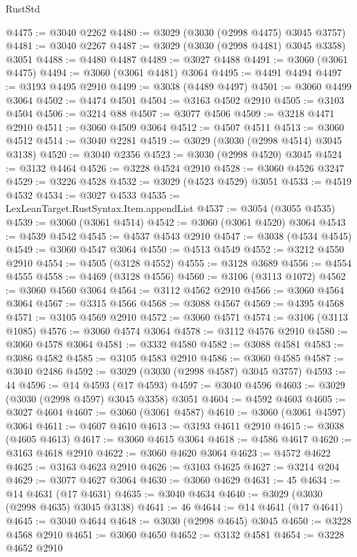 \begin{lexlean}{RustStd}
\begin{coremodule}
@4475 := @3040 @2262
@4480 := @3029 (@3030 (@2998 @4475) @3045 @3757)
@4481 := @3040 @2267
@4487 := @3029 (@3030 (@2998 @4481) @3045 @3358) @3051
@4488 := @4480 @4487
@4489 := @3027 @4488
@4491 := @3060 (@3061 @4475)
@4494 := @3060 (@3061 @4481) @3064
@4495 := @4491 @4494
@4497 := @3193 @4495 @2910
@4499 := @3038 (@4489 @4497)
@4501 := @3060 @4499 @3064
@4502 := @4474 @4501
@4504 := @3163 @4502 @2910
@4505 := @3103 @4504
@4506 := @3214 @88
@4507 := @3077 @4506
@4509 := @3218 @4471 @2910
@4511 := @3060 @4509 @3064
@4512 := @4507 @4511
@4513 := @3060 @4512
@4514 := @3040 @2281
@4519 := @3029 (@3030 (@2998 @4514) @3045 @3138)
@4520 := @3040 @2356
@4523 := @3030 (@2998 @4520) @3045
@4524 := @3132 @4464
@4526 := @3228 @4524 @2910
@4528 := @3060 @4526 @3247
@4529 := @3226 @4528
@4532 := @3029 (@4523 @4529) @3051
@4533 := @4519 @4532
@4534 := @3027 @4533
@4535 := LexLeanTarget.RustSyntax.Item.appendList
@4537 := @3054 (@3055 @4535)
@4539 := @3060 (@3061 @4514)
@4542 := @3060 (@3061 @4520) @3064
@4543 := @4539 @4542
@4545 := @4537 @4543 @2910
@4547 := @3038 (@4534 @4545)
@4549 := @3060 @4547 @3064
@4550 := @4513 @4549
@4552 := @3212 @4550 @2910
@4554 := @4505 (@3128 @4552)
@4555 := @3128 @3689
@4556 := @4554 @4555
@4558 := @4469 (@3128 @4556)
@4560 := @3106 (@3113 @1072)
@4562 := @3060 @4560 @3064
@4564 := @3112 @4562 @2910
@4566 := @3060 @4564 @3064
@4567 := @3315 @4566
@4568 := @3088 @4567
@4569 := @4395 @4568
@4571 := @3105 @4569 @2910
@4572 := @3060 @4571
@4574 := @3106 (@3113 @1085)
@4576 := @3060 @4574 @3064
@4578 := @3112 @4576 @2910
@4580 := @3060 @4578 @3064
@4581 := @3332 @4580
@4582 := @3088 @4581
@4583 := @3086 @4582
@4585 := @3105 @4583 @2910
@4586 := @3060 @4585
@4587 := @3040 @2486
@4592 := @3029 (@3030 (@2998 @4587) @3045 @3757)
@4593 := 44
@4596 := @14 @4593 (@17 @4593)
@4597 := @3040 @4596
@4603 := @3029 (@3030 (@2998 @4597) @3045 @3358) @3051
@4604 := @4592 @4603
@4605 := @3027 @4604
@4607 := @3060 (@3061 @4587)
@4610 := @3060 (@3061 @4597) @3064
@4611 := @4607 @4610
@4613 := @3193 @4611 @2910
@4615 := @3038 (@4605 @4613)
@4617 := @3060 @4615 @3064
@4618 := @4586 @4617
@4620 := @3163 @4618 @2910
@4622 := @3060 @4620 @3064
@4623 := @4572 @4622
@4625 := @3163 @4623 @2910
@4626 := @3103 @4625
@4627 := @3214 @204
@4629 := @3077 @4627 @3064
@4630 := @3060 @4629
@4631 := 45
@4634 := @14 @4631 (@17 @4631)
@4635 := @3040 @4634
@4640 := @3029 (@3030 (@2998 @4635) @3045 @3138)
@4641 := 46
@4644 := @14 @4641 (@17 @4641)
@4645 := @3040 @4644
@4648 := @3030 (@2998 @4645) @3045
@4650 := @3228 @4568 @2910
@4651 := @3060 @4650
@4652 := @3132 @4581
@4654 := @3228 @4652 @2910

\end{coremodule}
\end{lexlean}

